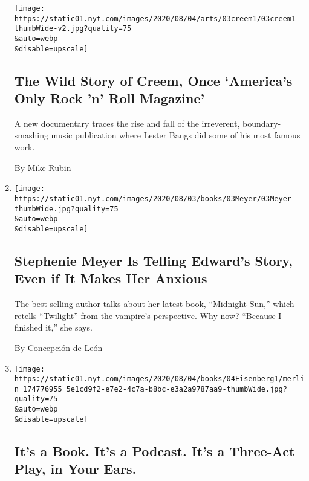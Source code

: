 \begin{enumerate}
  \texttt{[image: https://static01.nyt.com/images/2020/08/04/arts/03creem1/03creem1-thumbWide-v2.jpg?quality=75\\\&auto=webp\\\&disable=upscale]}

  \hypertarget{the-wild-story-of-creem-once-americas-only-rock-n-roll-magazine}{%
  \subsection{The Wild Story of Creem, Once `America's Only Rock 'n'
  Roll
  Magazine'}\label{the-wild-story-of-creem-once-americas-only-rock-n-roll-magazine}}

  A new documentary traces the rise and fall of the irreverent,
  boundary-smashing music publication where Lester Bangs did some of his
  most famous work.

  By Mike Rubin
\item
  \href{/2020/08/03/books/midnight-sun-stephenie-meyer-twilight.html}{}

  \texttt{[image: https://static01.nyt.com/images/2020/08/03/books/03Meyer/03Meyer-thumbWide.jpg?quality=75\\\&auto=webp\\\&disable=upscale]}

  \hypertarget{stephenie-meyer-is-telling-edwards-story-even-if-it-makes-her-anxious}{%
  \subsection{Stephenie Meyer Is Telling Edward's Story, Even if It
  Makes Her
  Anxious}\label{stephenie-meyer-is-telling-edwards-story-even-if-it-makes-her-anxious}}

  The best-selling author talks about her latest book, ``Midnight Sun,''
  which retells ``Twilight'' from the vampire's perspective. Why now?
  ``Because I finished it,'' she says.

  By Concepción de León
\item
  \href{/2020/08/02/books/jesse-eisenberg-when-you-finish-saving-the-world-audio.html}{}

  \texttt{[image: https://static01.nyt.com/images/2020/08/04/books/04Eisenberg1/merlin\_174776955\_5e1cd9f2-e7e2-4c7a-b8bc-e3a2a9787aa9-thumbWide.jpg?quality=75\\\&auto=webp\\\&disable=upscale]}

  \hypertarget{its-a-book-its-a-podcast-its-a-three-act-play-in-your-ears}{%
  \subsection{It's a Book. It's a Podcast. It's a Three-Act Play, in
  Your
  Ears.}\label{its-a-book-its-a-podcast-its-a-three-act-play-in-your-ears}}


\end{enumerate}
